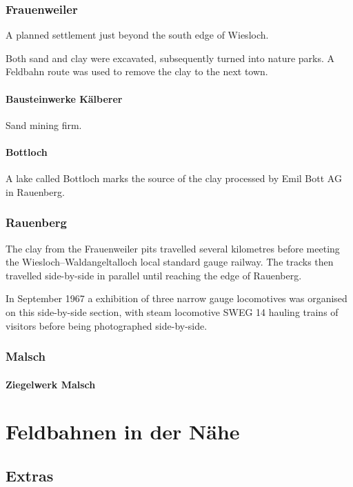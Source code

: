 \documentclass[a4paper]{report}
\begin{document}
\section{Frauenweiler}

A planned settlement just beyond the south edge of Wiesloch.

Both sand and clay were excavated, subsequently turned into nature
parks. A Feldbahn route was used to remove the clay to the next town.

\subsection{Bausteinwerke Kälberer}

Sand mining firm.

\subsection{Bottloch}

A lake called Bottloch marks the source of the clay processed by Emil
Bott AG in Rauenberg.

\section{Rauenberg}

The clay from the Frauenweiler pits travelled several kilometres
before meeting the Wiesloch--Waldangeltalloch local standard gauge
railway.  The tracks then travelled side-by-side in parallel until
reaching the edge of Rauenberg.\cite{schubert1989}

In September 1967 a exhibition of three narrow gauge locomotives was
organised on this side-by-side section, with steam locomotive SWEG 14
hauling trains of visitors before being photographed side-by-side.

\section{Malsch}

\subsection{Ziegelwerk Malsch}

\part{Feldbahnen in der Nähe}

\chapter{Extras}
\end{document}
